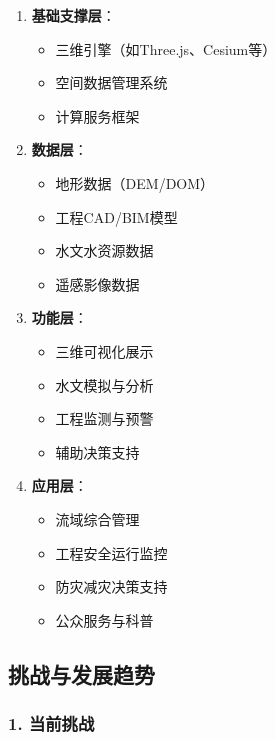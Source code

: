 \begin{enumerate}
\def\labelenumi{\arabic{enumi}.}
\tightlist
\item
  \textbf{基础支撑层}：

  \begin{itemize}
  \tightlist
  \item
    三维引擎（如Three.js、Cesium等）
  \item
    空间数据管理系统
  \item
    计算服务框架
  \end{itemize}
\item
  \textbf{数据层}：

  \begin{itemize}
  \tightlist
  \item
    地形数据（DEM/DOM）
  \item
    工程CAD/BIM模型
  \item
    水文水资源数据
  \item
    遥感影像数据
  \end{itemize}
\item
  \textbf{功能层}：

  \begin{itemize}
  \tightlist
  \item
    三维可视化展示
  \item
    水文模拟与分析
  \item
    工程监测与预警
  \item
    辅助决策支持
  \end{itemize}
\item
  \textbf{应用层}：

  \begin{itemize}
  \tightlist
  \item
    流域综合管理
  \item
    工程安全运行监控
  \item
    防灾减灾决策支持
  \item
    公众服务与科普
  \end{itemize}
\end{enumerate}

\subsection{挑战与发展趋势}\label{ux6311ux6218ux4e0eux53d1ux5c55ux8d8bux52bf}

\subsubsection{1. 当前挑战}\label{ux5f53ux524dux6311ux6218}

